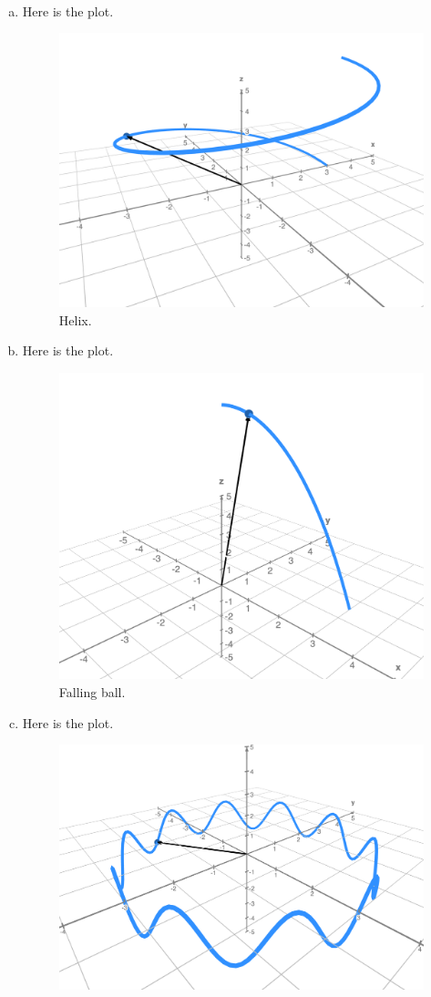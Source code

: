 \documentclass[12pt]{article} %
\begin{document}
\begin{solution}~
\begin{enumerate}[(a)]
    \item Here is the plot.
    \begin{figure}[H]
        \centering
        \includegraphics[width=.6\textwidth]{Images/helix.png}
        \caption{Helix.}
    \end{figure}
    \item Here is the plot.
    \begin{figure}[H]
        \centering
        \includegraphics[width=.6\textwidth]{Images/falling_ball.png}
        \caption{Falling ball.}
    \end{figure}
    \item Here is the plot.
    \begin{figure}[H]
        \centering
        \includegraphics[width=.6\textwidth]{Images/perturbed_orbiter.png}

\end{figure}
\end{enumerate}
\end{solution}
\end{document}
